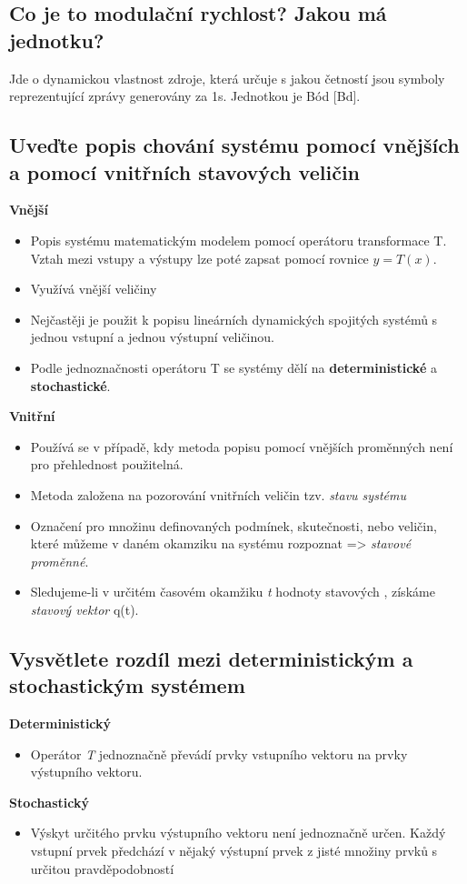 \subsection{Co je to modulační rychlost? Jakou má jednotku?}
Jde o dynamickou vlastnost zdroje, která určuje s jakou četností jsou symboly reprezentující zprávy generovány za 1s. Jednotkou je Bód [Bd].

\subsection{Uveďte popis chování systému pomocí vnějších a pomocí vnitřních stavových veličin}
\textbf{Vnější}
\begin{itemize}
    \item Popis systému matematickým modelem pomocí operátoru transformace T. Vztah mezi vstupy a výstupy lze poté zapsat pomocí rovnice $y=T(x)$.
    \item Využívá vnější veličiny
    \item Nejčastěji je použit k popisu lineárních dynamických  spojitých systémů s jednou vstupní a jednou výstupní veličinou.
    \item Podle jednoznačnosti operátoru T se systémy dělí na \textbf{deterministické} a \textbf{stochastické}.
    
\end{itemize}

\textbf{Vnitřní}
\begin{itemize}
    \item Používá se v případě, kdy metoda popisu pomocí vnějších proměnných není pro přehlednost použitelná.
    \item Metoda založena na pozorování vnitřních veličin tzv. \textit{stavu systému}
    \item Označení pro množinu definovaných podmínek, skutečnosti, nebo veličin, které můžeme v daném okamziku na systému rozpoznat => \textit{stavové proměnné}.
    \item Sledujeme-li v určitém časovém okamžiku \textit{t} hodnoty stavových , získáme \textit{stavový vektor} q(t).
\end{itemize}

\subsection{Vysvětlete rozdíl mezi deterministickým a stochastickým systémem}

\textbf{Deterministický}
\begin{itemize}
    \item Operátor \emph{T} jednoznačně převádí prvky vstupního vektoru na prvky výstupního vektoru.

\end{itemize}
\textbf{Stochastický}
\begin{itemize}
    \item Výskyt určitého prvku výstupního vektoru není jednoznačně určen.
    Každý vstupní prvek předchází v nějaký výstupní prvek z jisté množiny prvků s určitou pravděpodobností
    
\end{itemize}
